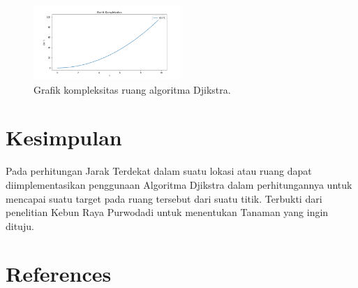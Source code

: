 \documentclass[conference]{IEEEtran}
\begin{document}
    \begin{figure}[htbp]
        \centerline{\includegraphics[width=0.5\textwidth]{./sources/onn.png}}
        \caption{Grafik kompleksitas ruang algoritma Djikstra.}
        \label{fig9}
    \end{figure}

\section{Kesimpulan}

    Pada perhitungan Jarak Terdekat dalam suatu lokasi atau ruang dapat diimplementasikan penggunaan Algoritma Djikstra
    dalam perhitungannya untuk mencapai suatu target pada ruang tersebut dari suatu titik. Terbukti dari penelitian Kebun Raya
    Purwodadi untuk menentukan Tanaman yang ingin dituju.

\section*{References}



\end{document}
